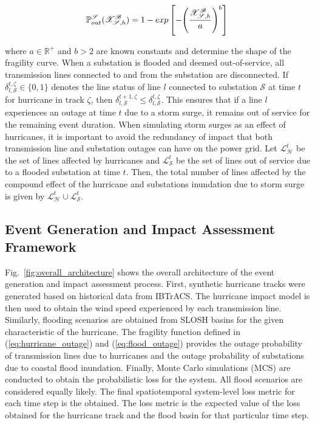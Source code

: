\documentclass[hidelinks, 12pt]{article}
\begin{document}
\vspace{-1em}
\begin{equation} 
\small
\mathbb{P}^{\mathcal{S}}_{out}(\mathcal{X}^\mathcal{B}_{\mathcal{S}, h}) = 1 - exp\left[- {\left(\frac{\mathcal{X}^\mathcal{B}_{\mathcal{S}, h}}{a}\right)^b}\right] \\
\label{eq:flood_outage}
\end{equation}

\noindent
where $a\in \mathbb{R}^+$ and $b>2$ are known constants and determine the shape of the fragility curve. When a substation is flooded and deemed out-of-service, all transmission lines connected to and from the substation are disconnected. If $\delta_{l,\mathcal{S}}^{t,\zeta} \in \{0,1\}$ denotes the line status of line $l$ connected to substation $\mathcal{S}$ at time $t$ for hurricane in track $\zeta$, then $\delta_{l, \mathcal{S}}^{t + 1,\zeta} \leq  \delta_{l,\mathcal{S}}^{t,\zeta}$. This ensures that if a line $l$ experiences an outage at time $t$ due to a storm surge, it remains out of service for the remaining event duration. 
When simulating storm surges as an effect of hurricanes, it is important to avoid the redundancy of impact that both transmission line and substation outages can have on the power grid. Let $\mathcal{L}^t_\mathcal{H}$ be the set of lines affected by hurricanes and $\mathcal{L}^t_\mathcal{S}$ be the set of lines out of service due to a flooded substation at time $t$. Then, the total number of lines affected by the compound effect of the hurricane and substations inundation due to storm surge is given by $\mathcal{L}^t_\mathcal{H} \cup \mathcal{L}^t_\mathcal{S}$.  


\subsection{Event Generation and Impact Assessment Framework}
Fig.~\ref{fig:overall_architecture} shows the overall architecture of the event generation and impact assessment process. First, synthetic hurricane tracks were generated based on historical data from IBTrACS. The hurricane impact model is then used to obtain the wind speed experienced by each transmission line. Similarly, flooding scenarios are obtained from SLOSH basins for the given characteristic of the hurricane. The fragility function defined in (\ref{eq:hurricane_outage}) and (\ref{eq:flood_outage}) provides the outage probability of transmission lines due to hurricanes and the outage probability of substations due to coastal flood inundation. Finally, Monte Carlo simulations (MCS) are conducted to obtain the probabilistic loss for the system. All flood scenarios are considered equally likely. The final spatiotemporal system-level loss metric for each time step is the obtained. The loss metric is the expected value of the loss obtained for the hurricane track and the flood basin for that particular time step.
\end{document}
